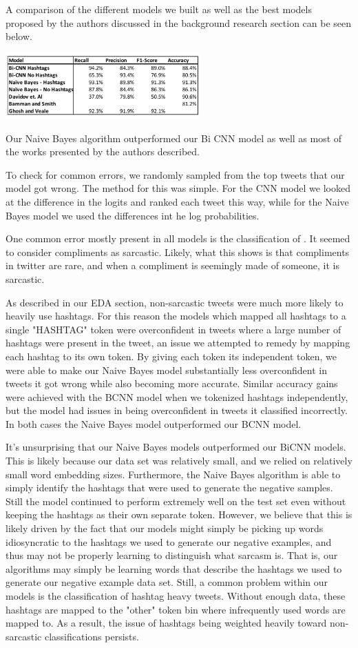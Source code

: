 \documentclass[11pt,a4paper]{article}
\begin{document}
A comparison of the different models we built as well as the best models proposed by the authors discussed in the background research section can be seen below.

\includegraphics[width=75mm,scale=0.5]{results.png}

Our Naive Bayes algorithm outperformed our Bi CNN model as well as most of the works presented by the authors described.

To check for common errors, we randomly sampled from the top  tweets that our model got wrong. The method for this was simple. For the CNN model we looked at the difference in the logits and ranked each tweet this way, while for the Naive Bayes model we used the differences int he log probabilities. 

One common error mostly present in all models is the classification of . It seemed to consider compliments as sarcastic. Likely, what this shows is that compliments in twitter are rare, and when a compliment is seemingly made of someone, it is sarcastic. 

As described in our EDA section, non-sarcastic tweets were much more likely to heavily use hashtags. For this reason the models which mapped all hashtags to a single "HASHTAG" token were overconfident in tweets where a large number of hashtags were present in the tweet, an issue we attempted to remedy by mapping each hashtag to its own token. By giving each token its independent token, we were able to make our Naive Bayes model substantially less overconfident in tweets it got wrong while also becoming more accurate. Similar accuracy gains were achieved with the BCNN model when we tokenized hashtags independently, but the model had issues in being overconfident in tweets it classified incorrectly. In both cases the Naive Bayes model outperformed our BCNN model.

It's unsurprising that our Naive Bayes models outperformed our BiCNN models. This is likely because our data set was relatively small, and we relied on relatively small word embedding sizes. Furthermore, the Naive Bayes algorithm is able to simply identify the hashtags that were used to generate the negative samples. Still the model continued to perform extremely well on the test set even without keeping the hashtags as their own separate token. However, we believe that this is likely driven by the fact that our models might simply be picking up words idiosyncratic to the hashtags we used to generate our negative examples, and thus may not be properly learning to distinguish what sarcasm is. That is, our algorithms may simply be learning words that describe the hashtags we used to generate our negative example data set. Still, a common problem within our models is the classification of hashtag heavy tweets. Without enough data, these hashtags are mapped to the "other" token bin where infrequently used words are mapped to. As a result, the issue of hashtags being weighted heavily toward non-sarcastic classifications persists.
\end{document}
